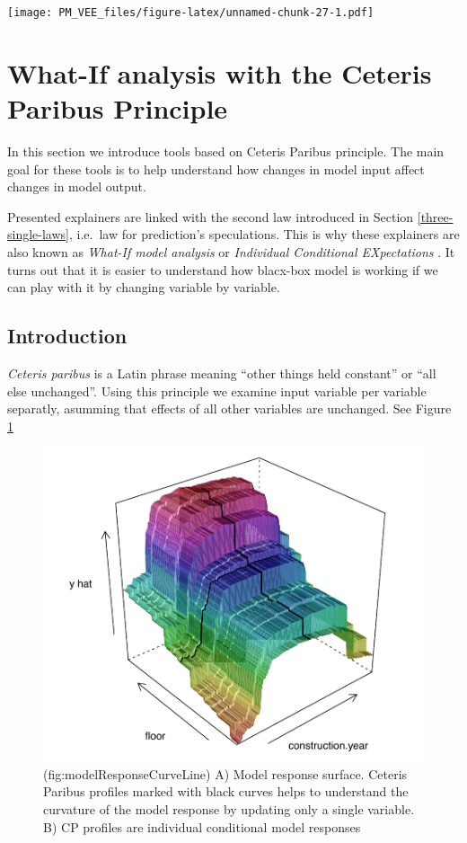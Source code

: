 \documentclass[]{krantz}
\theoremstyle{definition}
\theoremstyle{definition}
\theoremstyle{definition}
\theoremstyle{remark}
\begin{document}
\texttt{[image: PM\_VEE\_files/figure-latex/unnamed-chunk-27-1.pdf]}

\hypertarget{ceterisParibus}{%
\section{What-If analysis with the Ceteris Paribus
Principle}\label{ceterisParibus}}

In this section we introduce tools based on Ceteris Paribus principle.
The main goal for these tools is to help understand how changes in model
input affect changes in model output.

Presented explainers are linked with the second law introduced in
Section \ref{three-single-laws}, i.e.~law for prediction's speculations.
This is why these explainers are also known as \emph{What-If model
analysis} or \emph{Individual Conditional EXpectations} \citep{ICEbox}.
It turns out that it is easier to understand how blacx-box model is
working if we can play with it by changing variable by variable.

\hypertarget{introduction-1}{%
\subsection{Introduction}\label{introduction-1}}

\emph{Ceteris paribus} is a Latin phrase meaning ``other things held
constant'' or ``all else unchanged''. Using this principle we examine
input variable per variable separatly, asumming that effects of all
other variables are unchanged. See Figure
\ref{fig:modelResponseCurveLine}

\begin{figure}

{\centering \includegraphics[width=0.7\linewidth]{figure/model_response_line} 

}

\caption{(fig:modelResponseCurveLine) A) Model response surface. Ceteris Paribus profiles marked with black curves helps to understand the curvature of the model response by updating only a single variable. B) CP profiles are individual conditional model responses}\label{fig:modelResponseCurveLine}
\end{figure}
\end{document}
